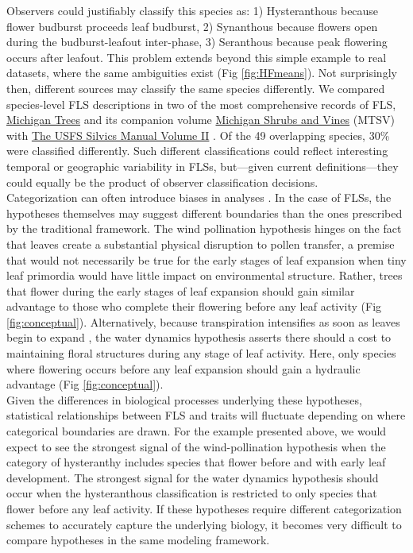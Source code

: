 \documentclass[12pt]{article}
\begin{document}
\noindent Observers could justifiably classify this species as: 1) Hysteranthous because flower budburst proceeds leaf budburst, 2) Synanthous because flowers open during the budburst-leafout inter-phase, 3) Seranthous because peak flowering occurs after leafout. This problem extends beyond this simple example to real datasets, \citep[e.g.][]{OKeefe2015} where the same ambiguities exist (Fig \ref{fig:HFmeans}). Not surprisingly then, different sources may classify the same species differently. We compared species-level FLS descriptions in two of the most comprehensive records of FLS, \underline{Michigan Trees} and its companion volume \underline{Michigan Shrubs and Vines} (MTSV) \citep{Barnes2004,Barnes2016} with \underline{The USFS Silvics Manual Volume II} \citep{Burns1990}. Of the 49 overlapping species, 30\% were classified differently. Such different classifications could reflect interesting temporal or geographic variability in FLSs, but---given current definitions---they could equally be the product of observer classification decisions.\\

\noindent Categorization can often introduce biases in analyses \citep{Royston2006}. In the case of FLSs, the hypotheses themselves may suggest different boundaries than the ones prescribed by the traditional framework. The wind pollination hypothesis hinges on the fact that leaves create a substantial physical disruption to pollen transfer, a premise that would not necessarily be true for the early stages of leaf expansion when tiny leaf primordia would have little impact on environmental structure. Rather, trees that flower during the early stages of leaf expansion should gain similar advantage to those who complete their flowering before any leaf activity (Fig \ref{fig:conceptual}). Alternatively, because transpiration intensifies as soon as leaves begin to expand \citep{%
Wang2018}, the water dynamics hypothesis asserts there should a cost to maintaining floral structures during any stage of leaf activity. Here, only species where flowering occurs before any leaf expansion should gain a hydraulic advantage (Fig \ref{fig:conceptual}).\\ 

\noindent Given the differences in biological processes underlying these hypotheses, statistical relationships between FLS and traits will fluctuate depending on where categorical boundaries are drawn. For the example presented above, we would expect to see the strongest signal of the wind-pollination hypothesis when the category of hysteranthy includes species that flower before and with early leaf development. The strongest signal for the water dynamics hypothesis should occur when the hysteranthous classification is restricted to only species that flower before any leaf activity. If these hypotheses require different categorization schemes to accurately capture the underlying biology, it becomes very difficult to compare hypotheses in the same modeling framework.\\
\end{document}
